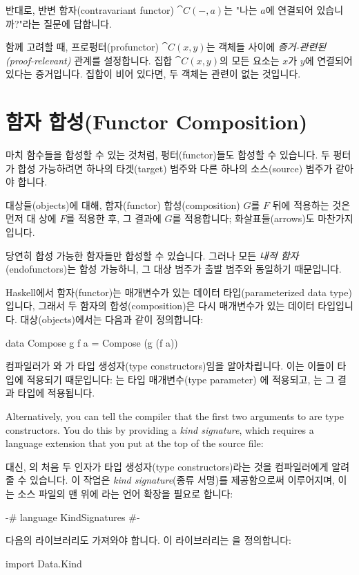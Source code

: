 \documentclass[DaoFP]{subfiles}
\begin{document}
반대로, 반변 함자(contravariant functor) $\cat C (-, a)$는 "나는 $a$에 연결되어 있습니까?"라는 질문에 답합니다.

함께 고려할 때, 프로펑터(profunctor) $\cat C(x, y)$는 객체들 사이에 \emph{증거-관련된(proof-relevant)} 관계를 설정합니다. 집합 $\cat C(x, y)$의 모든 요소는 $x$가 $y$에 연결되어 있다는 증거입니다. 집합이 비어 있다면, 두 객체는 관련이 없는 것입니다.

\section{함자 합성(Functor Composition)}

마치 함수들을 합성할 수 있는 것처럼, 펑터(functor)들도 합성할 수 있습니다. 두 펑터가 합성 가능하려면 하나의 타겟(target) 범주와 다른 하나의 소스(source) 범주가 같아야 합니다.

대상들(objects)에 대해, 함자(functor) 합성(composition) $G$를 $F$ 뒤에 적용하는 것은 먼저 대 상에 $F$를 적용한 후, 그 결과에 $G$를 적용합니다; 화살표들(arrows)도 마찬가지입니다.
 
당연히 합성 가능한 함자들만 합성할 수 있습니다. 그러나 모든 \emph{내적 함자}(endofunctors)는 합성 가능하니, 그 대상 범주가 출발 범주와 동일하기 때문입니다.
 
Haskell에서 함자(functor)는 매개변수가 있는 데이터 타입(parameterized data type)입니다, 그래서 두 함자의 합성(composition)은 다시 매개변수가 있는 데이터 타입입니다. 대상(objects)에서는 다음과 같이 정의합니다:
 \begin{haskell}
data Compose g f a = Compose (g (f a))
\end{haskell}
컴파일러가 와 가 타입 생성자(type constructors)임을 알아차립니다. 이는 이들이 타입에 적용되기 때문입니다: 는 타입 매개변수(type parameter) 에 적용되고, 는 그 결과 타입에 적용됩니다.

Alternatively, you can tell the compiler that the first two arguments to  are type constructors. You do this by providing a \emph{kind signature}, which requires a language extension  that you put at the top of the source file:

대신, 의 처음 두 인자가 타입 생성자(type constructors)라는 것을 컴파일러에게 알려줄 수 있습니다. 이 작업은 \emph{kind signature}(종류 서명)를 제공함으로써 이루어지며, 이는 소스 파일의 맨 위에 라는 언어 확장을 필요로 합니다:
\begin{haskell}
{-# language KindSignatures #-}
\end{haskell}
다음의  라이브러리도 가져와야 합니다. 이 라이브러리는 을 정의합니다:
\begin{haskell}
import Data.Kind
\end{haskell}
\end{document}
